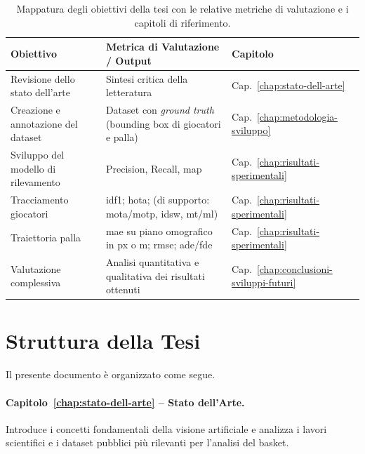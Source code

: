 \documentclass[12pt,a4paper,openright,twoside]{book}
\begin{document}
\begin{table}[h!]
  \centering
  \caption{Mappatura degli obiettivi della tesi con le relative metriche di valutazione 
  e i capitoli di riferimento.}
  \label{tab:obiettivi_metriche_capitoli}
  \begin{tabularx}{\textwidth}{l Y l}
    \toprule
    \textbf{Obiettivo} & \textbf{Metrica di Valutazione / Output} & \textbf{Capitolo} \\
    \midrule
    Revisione dello stato dell'arte & Sintesi critica della letteratura 
    & Cap.~\ref{chap:stato-dell-arte} \\
    \addlinespace
    Creazione e annotazione del dataset & Dataset con \emph{ground truth} 
    (bounding box di giocatori e palla) & Cap.~\ref{chap:metodologia-sviluppo} \\
    \addlinespace
    Sviluppo del modello di rilevamento & Precision, Recall, \ac{map} 
    & Cap.~\ref{chap:risultati-sperimentali} \\
    \addlinespace
    Tracciamento giocatori & \ac{idf1}; \ac{hota}; 
    (di supporto: \ac{mota}/\ac{motp}, \acf{idsw}, \acf{mt}/\acf{ml}) 
    & Cap.~\ref{chap:risultati-sperimentali} \\
    \addlinespace
    Traiettoria palla & \acf{mae} su piano omografico in \acf{px} o \acf{m}; 
    \ac{rmse}; \acf{ade}/\acf{fde} & Cap.~\ref{chap:risultati-sperimentali} \\
    \addlinespace
    Valutazione complessiva & Analisi quantitativa e qualitativa dei risultati 
    ottenuti & Cap.~\ref{chap:conclusioni-sviluppi-futuri} \\
    \bottomrule
  \end{tabularx}
\end{table}

\section{Struttura della Tesi}
\label{sec:struttura-tesi}
Il presente documento è organizzato come segue.

\paragraph{Capitolo~\ref{chap:stato-dell-arte} -- Stato dell'Arte.} 
Introduce i concetti fondamentali della visione artificiale e 
analizza i lavori scientifici e i dataset pubblici più 
rilevanti per l'analisi del basket.
\end{document}
